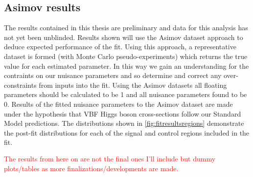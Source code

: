 \subsection{Asimov results}
The results contained in this thesis are preliminary and data for this analysis has not yet been unblinded. Results shown will use the Asimov dataset approach to deduce expected performance of the fit. Using this approach, a representative dataset is formed (with Monte Carlo pseudo-experiments) which returns the true value for each estimated parameter. In this way we gain an understanding for the contraints on our nuisance parameters and so determine and correct any over-constraints from inputs into the fit. Using the Asimov datasets all floating parameters should be calculated to be 1 and all nuisance parameters found to be 0. Results of the fitted nuisance parameters to the Asimov dataset are made under the hypothesis that VBF Higgs boson cross-sections follow our Standard Model predictions. The distributions shown in \ref{fig:fitresultsregions} demonstrate the post-fit distributions for each of the signal and control regions included in the fit. 

\textcolor{red}{The results from here on are not the final ones I'll include but dummy plots/tables as more finalizations/developments are made.}


